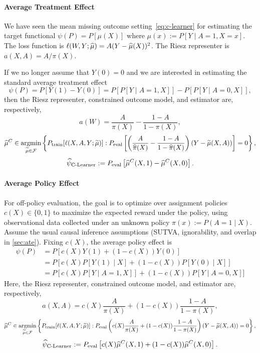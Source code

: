 \paragraph{Average Treatment Effect}
We have seen the mean missing outcome setting~\eqref{eq:c-learner} for estimating the target functional $\psi(P) = P[\mu(X)]$ where $\mu(x):=P[Y\mid A=1,X=x]$. The loss function is $\ell(W,Y;\widehat{\mu}) = A(Y-\widehat{\mu}(X))^2$. The Riesz representer is $a(X,A) = A/\pi(X)$.

If we no longer assume that $Y(0)=0$ and we are interested in estimating the standard average treatment effect 
$$
\psi(P) = P[Y(1)-Y(0)]=P\left[P[Y\mid A=1, X]\right]-P\left[P[Y\mid A=0, X]\right],
$$ then the Riesz representer, constrained outcome model, and estimator are, respectively,
$$a(W) = \frac{A}{\pi(X)} - \frac{1-A}{1-\pi(X)},$$
\begin{equation*}
\widehat{\mu}^C\in\mathop{\rm argmin}_{\widetilde{\mu}\in\mathcal F} 
\left\{ P_{\rm train}[\ell(X,A,Y;\widetilde{\mu})] : P_{\rm eval} \left[\left(\frac{A}{\widehat{\pi}(X)} - \frac{1-A}{1-\widehat{\pi}(X)}\right)(Y-\widetilde{\mu}(X,A))
\right]=0
\right\},
\end{equation*}
$$\widehat{\psi}_{\textrm {C-Learner}} := P_{\rm eval}
\left[\widehat{\mu}^C(X,1)-\widehat{\mu}^C(X,0)\right]
.$$


\paragraph{Average Policy Effect}
For off-policy evaluation, the goal is to optimize over assignment policies $c(X)\in\{0,1\}$ to maximize the expected reward under the policy, using observational data collected under an unknown policy $\pi(x):=P(A=1\mid X)$. Assume the usual causal inference assumptions (SUTVA, ignorability, and overlap in \cref{sec:ate}). Fixing $c(X)$, the average policy effect is
\begin{align*}
    \psi(P) &= P[c(X)Y(1) + (1-c(X))Y(0)] \\
    &= P[c(X)P[Y(1)\mid X] + (1-c(X))P[Y(0)\mid X]] \\
    &= P[c(X)P[Y\mid A=1, X]] + (1-c(X))P[Y\mid A=0, X]] %
\end{align*}
Here, the Riesz representer, constrained outcome model, and estimator are, respectively,
$$
a(X,A) = c(X)\frac{A}{\pi(X)}  + (1-c(X))\frac{1-A}{1-\pi(X)},
$$
\begin{equation*}
\widehat{\mu}^C\in\mathop{\rm argmin}_{\widetilde{\mu}\in\mathcal F} 
\left\{ P_{\rm train}[\ell(X,A,Y;\widetilde{\mu})] : P_{\rm eval}  \left(c(X)\frac{A}{\pi(X)}  + (1-c(X))\frac{1-A}{1-\pi(X)} \right)(Y-\widetilde{\mu}(X,A))=0
\right\},
\end{equation*}
$$\widehat{\psi}_{\textrm {C-Learner}} := P_{\rm eval}
\left[c(X)\widehat{\mu}^C(X,1)+(1-c(X))\widehat{\mu}^C(X,0)\right]
.$$








